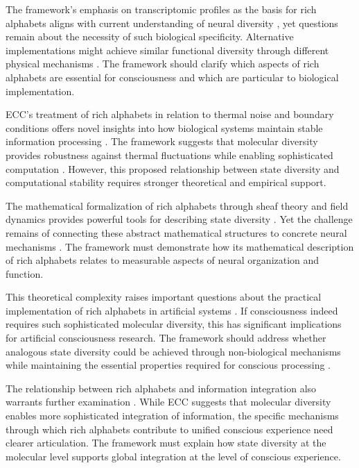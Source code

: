 \begin{refsection}
The framework's emphasis on transcriptomic profiles as the basis for rich alphabets aligns with current understanding of neural diversity \cite{rovelli2018order}, yet questions remain about the necessity of such biological specificity. Alternative implementations might achieve similar functional diversity through different physical mechanisms \cite{penrose2016fashion}. The framework should clarify which aspects of rich alphabets are essential for consciousness and which are particular to biological implementation.

ECC's treatment of rich alphabets in relation to thermal noise and boundary conditions offers novel insights into how biological systems maintain stable information processing \cite{rosen2012anticipatory}. The framework suggests that molecular diversity provides robustness against thermal fluctuations while enabling sophisticated computation \cite{thompson2014waking}. However, this proposed relationship between state diversity and computational stability requires stronger theoretical and empirical support.

The mathematical formalization of rich alphabets through sheaf theory and field dynamics provides powerful tools for describing state diversity \cite{langer2009philosophy}. Yet the challenge remains of connecting these abstract mathematical structures to concrete neural mechanisms \cite{varela2016embodied}. The framework must demonstrate how its mathematical description of rich alphabets relates to measurable aspects of neural organization and function.

This theoretical complexity raises important questions about the practical implementation of rich alphabets in artificial systems \cite{feinberg2016ancient}. If consciousness indeed requires such sophisticated molecular diversity, this has significant implications for artificial consciousness research. The framework should address whether analogous state diversity could be achieved through non-biological mechanisms while maintaining the essential properties required for conscious processing \cite{zahavi2014self}.

The relationship between rich alphabets and information integration also warrants further examination \cite{merleau2012phenomenology}. While ECC suggests that molecular diversity enables more sophisticated integration of information, the specific mechanisms through which rich alphabets contribute to unified conscious experience need clearer articulation. The framework must explain how state diversity at the molecular level supports global integration at the level of conscious experience.


\end{refsection}
